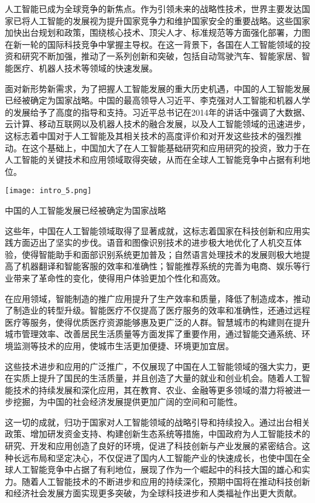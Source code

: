 人工智能已成为全球竞争的新焦点。作为引领未来的战略性技术，世界主要发达国家已将人工智能的发展视为提升国家竞争力和维护国家安全的重要战略。这些国家加快出台规划和政策，围绕核心技术、顶尖人才、标准规范等方面强化部署，力图在新一轮的国际科技竞争中掌握主导权。在这一背景下，各国在人工智能领域的投资和研究不断加强，推动了一系列创新和突破，包括自动驾驶汽车、智能家居、智能医疗、机器人技术等领域的快速发展。

面对新形势新需求，为了把握人工智能发展的重大历史机遇，中国的人工智能发展已经被确定为国家战略。中国的最高领导人习近平、李克强对人工智能和机器人学的发展给予了高度的指导和支持。习近平总书记在2014年的讲话中强调了大数据、云计算、移动互联网以及机器人技术的融合发展，以及人工智能领域的迅速进步，这标志着中国对于人工智能及其相关技术的高度评价和对开发这些技术的强烈推动。在这个基础上，中国加大了在人工智能基础研究和应用研究的投资，致力于在人工智能的关键技术和应用领域取得突破，从而在全球人工智能竞争中占据有利地位。

\begin{marginfigure}[-5.5cm]
	\texttt{[image: intro\_5.png]}
	\caption[中国的人工智能发展已经被确定为国家战略]{中国的人工智能发展已经被确定为国家战略}
\end{marginfigure}

这些年，中国在人工智能领域取得了显著成就，这标志着国家在科技创新和应用实践方面迈出了坚实的步伐。语音和图像识别技术的进步极大地优化了人机交互体验，使得智能助手和面部识别系统更加普及；自然语言处理技术的发展则极大地提高了机器翻译和智能客服的效率和准确性；智能推荐系统的完善为电商、娱乐等行业带来了革命性的变化，使得用户体验更加个性化和高效。

在应用领域，智能制造的推广应用提升了生产效率和质量，降低了制造成本，推动了制造业的转型升级。智能医疗不仅提高了医疗服务的效率和准确性，还通过远程医疗等服务，使得优质医疗资源能够惠及更广泛的人群。智慧城市的构建则在提升城市管理效率、改善居民生活质量等方面发挥了重要作用，通过智能交通系统、环境监测等技术的应用，使城市生活更加便捷、环境更加宜居。

这些技术进步和应用的广泛推广，不仅展现了中国在人工智能领域的强大实力，更在实质上提升了国民的生活质量，并且创造了大量的就业和创业机会。随着人工智能技术的持续发展和深化应用，其在教育、农业、金融等更多领域的潜力将被进一步挖掘，为中国的社会经济发展提供更加广阔的空间和可能性。

这一切的成就，归功于国家对人工智能领域的战略引导和持续投入。通过出台相关政策、增加研发资金支持、构建创新生态系统等措施，中国政府为人工智能技术的研究、开发和应用创造了良好的环境，促进了科技创新与产业发展的紧密结合。这种长远布局和坚定决心，不仅促进了国内人工智能产业的快速成长，也使中国在全球人工智能竞争中占据了有利地位，展现了作为一个崛起中的科技大国的雄心和实力。随着人工智能技术的不断进步和应用的持续深化，预期中国将在推动科技创新和经济社会发展方面实现更多突破，为全球科技进步和人类福祉作出更大贡献。

